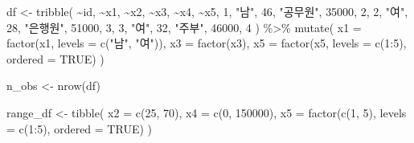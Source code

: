 \documentclass[
]{book}
\newenvironment{Shaded}{\begin{snugshade}}{\end{snugshade}}
\newcommand{\AttributeTok}[1]{\textcolor[rgb]{0.77,0.63,0.00}{#1}}
\newcommand{\ConstantTok}[1]{\textcolor[rgb]{0.00,0.00,0.00}{#1}}
\newcommand{\DecValTok}[1]{\textcolor[rgb]{0.00,0.00,0.81}{#1}}
\newcommand{\FunctionTok}[1]{\textcolor[rgb]{0.00,0.00,0.00}{#1}}
\newcommand{\NormalTok}[1]{#1}
\newcommand{\OtherTok}[1]{\textcolor[rgb]{0.56,0.35,0.01}{#1}}
\newcommand{\SpecialCharTok}[1]{\textcolor[rgb]{0.00,0.00,0.00}{#1}}
\newcommand{\StringTok}[1]{\textcolor[rgb]{0.31,0.60,0.02}{#1}}
\begin{document}
\begin{Shaded}
\begin{Highlighting}[]
\NormalTok{df }\OtherTok{\textless{}{-}} \FunctionTok{tribble}\NormalTok{(}
  \SpecialCharTok{\textasciitilde{}}\NormalTok{id, }\SpecialCharTok{\textasciitilde{}}\NormalTok{x1, }\SpecialCharTok{\textasciitilde{}}\NormalTok{x2, }\SpecialCharTok{\textasciitilde{}}\NormalTok{x3, }\SpecialCharTok{\textasciitilde{}}\NormalTok{x4, }\SpecialCharTok{\textasciitilde{}}\NormalTok{x5,}
  \DecValTok{1}\NormalTok{, }\StringTok{"남"}\NormalTok{, }\DecValTok{46}\NormalTok{, }\StringTok{"공무원"}\NormalTok{, }\DecValTok{35000}\NormalTok{, }\DecValTok{2}\NormalTok{,}
  \DecValTok{2}\NormalTok{, }\StringTok{"여"}\NormalTok{, }\DecValTok{28}\NormalTok{, }\StringTok{"은행원"}\NormalTok{, }\DecValTok{51000}\NormalTok{, }\DecValTok{3}\NormalTok{,}
  \DecValTok{3}\NormalTok{, }\StringTok{"여"}\NormalTok{, }\DecValTok{32}\NormalTok{, }\StringTok{"주부"}\NormalTok{, }\DecValTok{46000}\NormalTok{, }\DecValTok{4}
\NormalTok{) }\SpecialCharTok{\%\textgreater{}\%}
  \FunctionTok{mutate}\NormalTok{(}
    \AttributeTok{x1 =} \FunctionTok{factor}\NormalTok{(x1, }\AttributeTok{levels =} \FunctionTok{c}\NormalTok{(}\StringTok{"남"}\NormalTok{, }\StringTok{"여"}\NormalTok{)),}
    \AttributeTok{x3 =} \FunctionTok{factor}\NormalTok{(x3),}
    \AttributeTok{x5 =} \FunctionTok{factor}\NormalTok{(x5, }\AttributeTok{levels =} \FunctionTok{c}\NormalTok{(}\DecValTok{1}\SpecialCharTok{:}\DecValTok{5}\NormalTok{), }\AttributeTok{ordered =} \ConstantTok{TRUE}\NormalTok{)}
\NormalTok{  )}

\NormalTok{n\_obs }\OtherTok{\textless{}{-}} \FunctionTok{nrow}\NormalTok{(df)}

\NormalTok{range\_df }\OtherTok{\textless{}{-}} \FunctionTok{tibble}\NormalTok{(}
    \AttributeTok{x2 =} \FunctionTok{c}\NormalTok{(}\DecValTok{25}\NormalTok{, }\DecValTok{70}\NormalTok{),}
    \AttributeTok{x4 =} \FunctionTok{c}\NormalTok{(}\DecValTok{0}\NormalTok{, }\DecValTok{150000}\NormalTok{),}
    \AttributeTok{x5 =} \FunctionTok{factor}\NormalTok{(}\FunctionTok{c}\NormalTok{(}\DecValTok{1}\NormalTok{, }\DecValTok{5}\NormalTok{), }\AttributeTok{levels =} \FunctionTok{c}\NormalTok{(}\DecValTok{1}\SpecialCharTok{:}\DecValTok{5}\NormalTok{), }\AttributeTok{ordered =} \ConstantTok{TRUE}\NormalTok{)}
\NormalTok{  )}


\end{Highlighting}
\end{Shaded}
\end{document}

